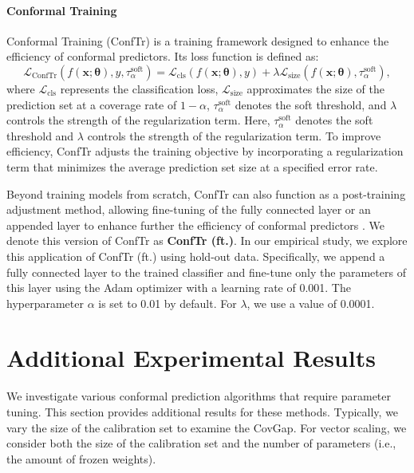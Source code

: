 \documentclass{article}
\newcommand{\1}{\mathbbm{1}}
\theoremstyle{plain}
\theoremstyle{definition}
\theoremstyle{remark}
\begin{document}
\paragraph{Conformal Training} Conformal Training (ConfTr) \cite{stutz2022learning} is a training framework designed to enhance the efficiency of conformal predictors. Its loss function is defined as:  
\begin{equation*}
\mathcal{L}_{\text{ConfTr}}(f(\boldsymbol{x}; \boldsymbol{\theta}), y, \tau^{\text{soft}}_\alpha) = \mathcal{L}_{\text{cls}}(f(\boldsymbol{x}; \boldsymbol{\theta}), y) + \lambda \mathcal{L}_{\text{size}}(f(\boldsymbol{x}; \boldsymbol{\theta}), \tau^{\text{soft}}_\alpha),
\end{equation*}  
where \(\mathcal{L}_{\text{cls}}\) represents the classification loss, \(\mathcal{L}_{\text{size}}\) approximates the size of the prediction set at a coverage rate of \(1 - \alpha\), \(\tau^{\text{soft}}_\alpha\) denotes the soft threshold, and \(\lambda\) controls the strength of the regularization term.  
Here, \(\tau^{\text{soft}}_\alpha\) denotes the soft threshold and \(\lambda\) controls the strength of the regularization term. To improve efficiency, ConfTr adjusts the training objective by incorporating a regularization term that minimizes the average prediction set size at a specified error rate. 

Beyond training models from scratch, ConfTr can also function as a post-training adjustment method, allowing fine-tuning of the fully connected layer or an appended layer to enhance further the efficiency of conformal predictors \citep{stutz2022learning, huang2023uncertainty}. We denote this version of ConfTr as \textbf{ConfTr (ft.)}. In our empirical study, we explore this application of ConfTr (ft.) using hold-out data. Specifically, we append a fully connected layer to the trained classifier and fine-tune only the parameters of this layer using the Adam optimizer \citep{kingma2017adam} with a learning rate of 0.001. The hyperparameter \(\alpha\) is set to 0.01 by default. For \(\lambda\), we use a value of 0.0001. 
  
\section{Additional Experimental Results}
\label{sec:additional_experimental_results}
We investigate various conformal prediction algorithms that require parameter tuning. This section provides additional results for these methods. Typically, we vary the size of the calibration set to examine the CovGap. For vector scaling, we consider both the size of the calibration set and the number of parameters (i.e., the amount of frozen weights).  
\end{document}
